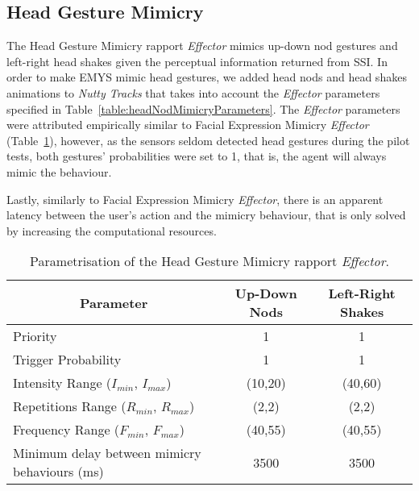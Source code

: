 \subsection{Head Gesture Mimicry}
\label{sub:sec:HeadNodMimicry}

The Head Gesture Mimicry rapport \textit{Effector} mimics up-down nod gestures and left-right head shakes given the perceptual information returned from \ac{SSI}. In order to make \ac{EMYS} mimic head gestures, we added head nods and head shakes animations to \textit{Nutty Tracks} that takes into account the \textit{Effector} parameters specified in Table~\ref{table:headNodMimicryParameters}. The \textit{Effector} parameters were attributed empirically similar to Facial Expression Mimicry \textit{Effector} (Table~\ref{table:headGesturesMimicryParametersValues}), however, as the sensors seldom detected head gestures during the pilot tests, both gestures' probabilities were set to 1, that is, the agent will always mimic the behaviour.

Lastly, similarly to Facial Expression Mimicry \textit{Effector}, there is an apparent latency between the user's action and the mimicry behaviour, that is only solved by increasing the computational resources.

\begin{table}[H]
	\centering
	\begin{tabular}{|l|c|c|}
	\hline
	\multicolumn{1}{|c|}{\textbf{Parameter}} & \textbf{Up-Down Nods} & \textbf{Left-Right Shakes} \\ \hline
		Priority & 1 & 1 \\ \hline
		Trigger Probability & 1 & 1 \\ \hline
		Intensity Range ($I_{min}$, $I_{max}$) & (10,20) & (40,60) \\ \hline
		Repetitions Range ($R_{min}$, $R_{max}$) & (2,2) & (2,2)\\ \hline
		Frequency Range ($F_{min}$, $F_{max}$) &  (40,55) & (40,55)\\ \thickhline		
		Minimum delay between mimicry behaviours (ms) & 3500 & 3500 \\ \hline		
	\end{tabular}
	\caption{Parametrisation of the Head Gesture Mimicry rapport \textit{Effector}.}
	\label{table:headGesturesMimicryParametersValues}
\end{table}